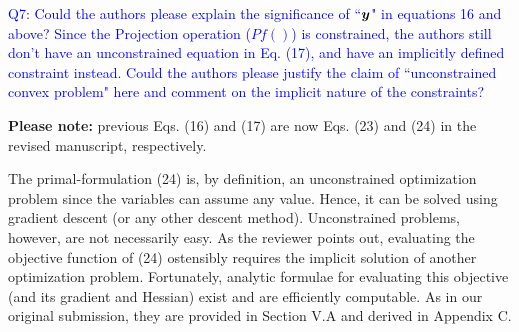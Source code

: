 \textcolor{blue}{Q7: Could the authors please explain the significance of
``${\bm{y}}$" in equations 16 and above? Since the Projection operation ($Pf()$)
is constrained, the authors still don't have an unconstrained equation in Eq.
(17), and have an implicitly defined constraint instead. Could the authors
please justify the claim of ``unconstrained convex problem" here and comment on
the implicit nature of the constraints?}

\textbf{Please note:} previous Eqs. (16) and (17) are now Eqs. (23) and (24)
in the revised manuscript, respectively.

The primal-formulation (24) is, by definition, an unconstrained optimization
problem since the variables can assume any value. Hence, it can be solved using
gradient descent (or any other descent method). Unconstrained problems, however,
are not necessarily easy. As the reviewer points out, evaluating the objective
function of (24) ostensibly requires the implicit solution of another
optimization problem. Fortunately, analytic formulae for evaluating this
objective (and its gradient and Hessian) exist and are efficiently computable.
As in our original submission, they are provided  in Section V.A and derived in
Appendix C.
\vspace{5mm}

